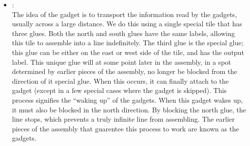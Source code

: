 \begin{itemize}
    \item {\firstwarp}:
    \\
    The idea of the {\firstwarp} gadget is to transport the information read by the {\cread} gadgets, usually across a large distance.
    We do this using a single special tile that has three glues.
    Both the north and south glues have the same labels, allowing this tile to assemble into a line indefinitely.
    The third glue is the special glue; this glue can be either on the east or west side of the tile, and has the output label.
    This unique glue will at some point later in the assembly, in a spot determined by earlier pieces of the assembly, no longer be blocked from the direction of it special glue.
    When this occurs, it can finally attach to the {\warpbridge} gadget (except in a few special cases where the {\warpbridge} gadget is skipped).
    This process signifies the ``waking up'' of the {\firstwarp} gadgets.
    When this gadget wakes up, it must also be blocked in the north direction.
    By blocking the north glue, the line stops, which prevents a truly infinite line from assembling.
    The earlier pieces of the assembly that guarentee this process to work are known as the {\dtop} gadgets.


\end{itemize}
